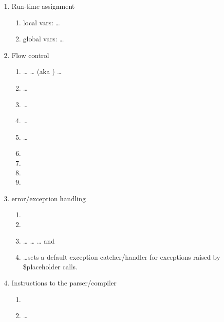 \begin{enumerate}
\item Run-time assignment
     \begin{enumerate}
     \item local vars:  \ldots
     \item global vars:  \ldots
     \end{enumerate}

\item Flow control
     \begin{enumerate}
     \item {} \ldots {} \ldots {} (aka
          ) \ldots {}
     \item {} \ldots {}
     \item {} \ldots {}
     \item {} \ldots {}
     \item {} \ldots {}
     \item {}
     \item {}
     \item {}
     \item {}
     \end{enumerate}

\item error/exception handling
     \begin{enumerate}
     \item {}
     \item {}
     \item {} \ldots {} \ldots {} \ldots
           and  
     \item {} \ldots sets a default exception catcher/handler for
          exceptions raised by \$placeholder calls.
     \end{enumerate}

\item Instructions to the parser/compiler
     \begin{enumerate}
     \item {}
     \item {} \ldots {}
     \end{enumerate}
\end{enumerate}

